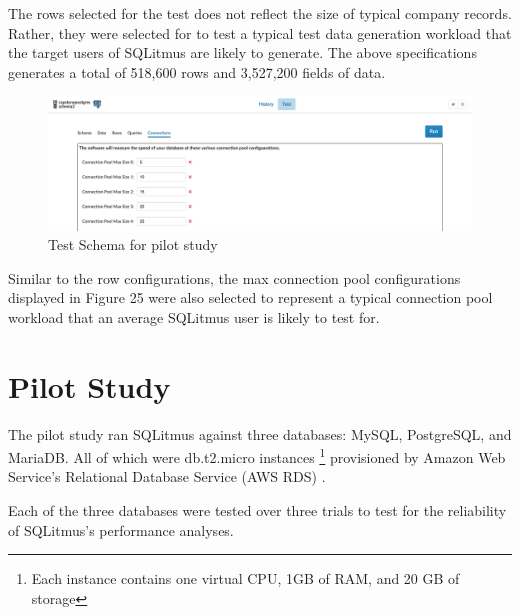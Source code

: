\documentclass[12pt]{report}
\begin{document}
\begin{spacing}{1.9}
\begin{figure}[H]
	\end{figure}
	
	The rows selected for the test does not reflect the size of typical company records. Rather, they were selected for to test a typical test data generation workload that the target users of SQLitmus are likely to generate. The above specifications generates a total of 518,600 rows and 3,527,200 fields of data.
	
	\begin{figure}[H]
		\centering
		\includegraphics[width=\textwidth]{4-3b.png}
		\caption{Test Schema for pilot study}
		
	\end{figure}
	
	Similar to the row configurations, the max connection pool configurations displayed in Figure 25 were also selected to represent a typical connection pool workload that an average SQLitmus user is likely to test for. 
	
	\chapter{Pilot Study}
	
	The pilot study ran SQLitmus against three databases: MySQL, PostgreSQL, and MariaDB. All of which were db.t2.micro instances \footnote{Each instance contains one virtual CPU, 1GB of RAM, and 20 GB of storage} provisioned by Amazon Web Service's Relational Database Service (AWS RDS) . 
	
	Each of the three databases were tested over three trials to test for the reliability of SQLitmus's performance analyses.
	
	
	\clearpage

\end{spacing}
\end{document}

